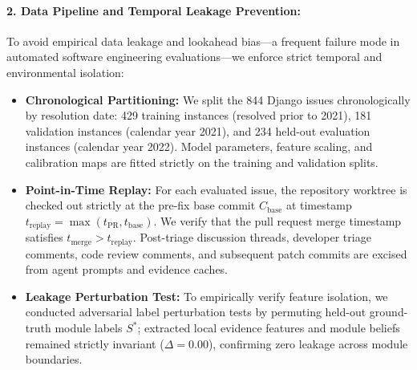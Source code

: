 \documentclass{article}
\theoremstyle{definition}
\begin{document}
\paragraph{2. Data Pipeline and Temporal Leakage Prevention:}
To avoid empirical data leakage and lookahead bias—a frequent failure mode in automated software engineering evaluations—we enforce strict temporal and environmental isolation:
\begin{itemize}
    \item \textbf{Chronological Partitioning:} We split the 844 Django issues chronologically by resolution date: 429 training instances (resolved prior to 2021), 181 validation instances (calendar year 2021), and 234 held-out evaluation instances (calendar year 2022). Model parameters, feature scaling, and calibration maps are fitted strictly on the training and validation splits.
    \item \textbf{Point-in-Time Replay:} For each evaluated issue, the repository worktree is checked out strictly at the pre-fix base commit $C_{\mathrm{base}}$ at timestamp $t_{\mathrm{replay}} = \max(t_{\mathrm{PR}}, t_{\mathrm{base}})$. We verify that the pull request merge timestamp satisfies $t_{\mathrm{merge}} > t_{\mathrm{replay}}$. Post-triage discussion threads, developer triage comments, code review comments, and subsequent patch commits are excised from agent prompts and evidence caches.
    \item \textbf{Leakage Perturbation Test:} To empirically verify feature isolation, we conducted adversarial label perturbation tests by permuting held-out ground-truth module labels $S^*$; extracted local evidence features and module beliefs remained strictly invariant ($\Delta = 0.00$), confirming zero leakage across module boundaries.
\end{itemize}
\end{document}
